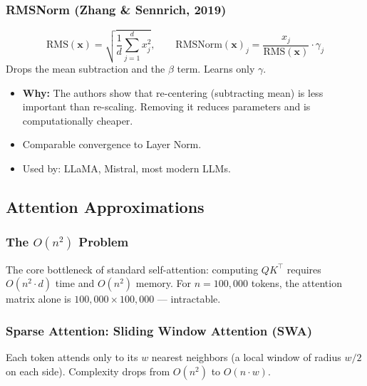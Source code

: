 \documentclass[11pt, a4paper]{article}
\begin{document}
\subsubsection{RMSNorm (Zhang \& Sennrich, 2019)}

\begin{defbox}
\[
\text{RMS}(\mathbf{x}) = \sqrt{\frac{1}{d}\sum_{j=1}^d x_j^2}, \qquad \text{RMSNorm}(\mathbf{x})_j = \frac{x_j}{\text{RMS}(\mathbf{x})} \cdot \gamma_j
\]
Drops the mean subtraction and the $\beta$ term. Learns only $\gamma$.
\end{defbox}

\begin{itemize}[leftmargin=2em]
  \item \textbf{Why:} The authors show that re-centering (subtracting mean) is less important than re-scaling. Removing it reduces parameters and is computationally cheaper.
  \item Comparable convergence to Layer Norm.
  \item Used by: LLaMA, Mistral, most modern LLMs.
\end{itemize}

\subsection{Attention Approximations}

\subsubsection{The $O(n^2)$ Problem}

The core bottleneck of standard self-attention: computing $QK^\top$ requires $O(n^2 \cdot d)$ time and $O(n^2)$ memory. For $n = 100{,}000$ tokens, the attention matrix alone is $100{,}000 \times 100{,}000$ --- intractable.

\subsubsection{Sparse Attention: Sliding Window Attention (SWA)}

\begin{defbox}
Each token attends only to its $w$ nearest neighbors (a local window of radius $w/2$ on each side). Complexity drops from $O(n^2)$ to $O(n \cdot w)$.
\end{defbox}
\end{document}
